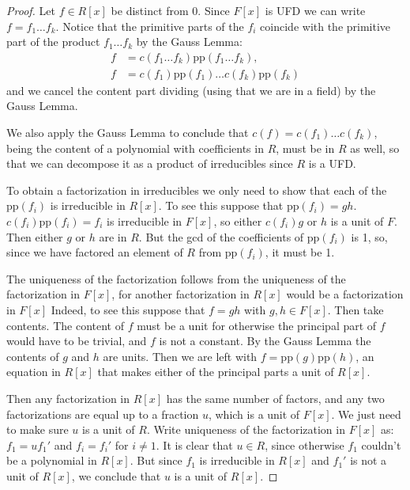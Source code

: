 \begin{proof}
Let $f\in R[x]$ be distinct from 0. Since
$F[x]$ is UFD we can write
$f=f_1\ldots f_k$. Notice that the primitive
parts of the $f_i$ coincide
with the primitive part of the product
$f_1\ldots f_k$ by
the Gauss Lemma:
$$
\begin{aligned}
f&=c(f_1\ldots f_k)\text{pp}(f_1\ldots
f_k),\\
f&=c(f_1)\text{pp}(f_1)\ldots
c(f_k)\text{pp}(f_k)
\end{aligned}
$$
and we cancel the content part dividing
(using that we are in a field) by the
Gauss Lemma.

We also apply the Gauss Lemma to conclude
that
$c(f)=c(f_1)\ldots c(f_k)$, being the content
of a polynomial with coefficients
in $R$, must be in $R$ as well, so that we
can decompose it as a product of
irreducibles since $R$ is a UFD.

To obtain a factorization in irreducibles we
only need to show that each of the
$\text{pp}(f_i)$ is irreducible in $R[x]$.
To see this suppose that
$\text{pp}(f_i)=gh$.
$c(f_i)\text{pp}(f_i)=f_i$ is irreducible
in $F[x]$, so either $c(f_i)g$ or $h$ is a
unit of $F$. Then
either $g$ or $h$ are in $R$. But the gcd of
the coefficients of $\text{pp}(f_i)$ is 1,
so, since we have factored
an element of $R$ from $\text{pp}(f_i)$, it
must be 1.

The uniqueness of the factorization follows
from the uniqueness of the
factorization in $F[x]$, for another
factorization in $R[x]$ would be a
factorization in $F[x]$
Indeed, to see this suppose that $f=gh$ with
$g,h \in F[x]$.
Then take contents. The content of  $f$ must
be a unit
for otherwise the principal part of $f$ would
have to be
trivial, and $f$ is not a constant.
By the Gauss Lemma the contents of $g$ and
$h$ are units.
Then we are left with
$f=\text{pp}(g)\text{pp}(h)$, an equation
in $R[x]$ that makes either of the principal
parts a unit of
$R[x]$.

Then any factorization in $R[x]$ has the
same number of factors,
and any two factorizations are equal up
to a fraction $u$,
which is a unit of $F[x]$. We just need to
make sure $u$ is a unit of $R$.
Write uniqueness of the factorization in
$F[x]$ as:
$f_1=uf_1'$ and $f_i=f_i'$ for $i\neq 1$.
It is clear that $u \in R$, since otherwise
$f_1$ couldn't
be a polynomial in $R[x]$. But since $f_1$ is
irreducible in $R[x]$
and $f_1'$ is not a unit of $R[x]$,
we conclude that $u$ is a unit of $R[x]$.
\end{proof}

